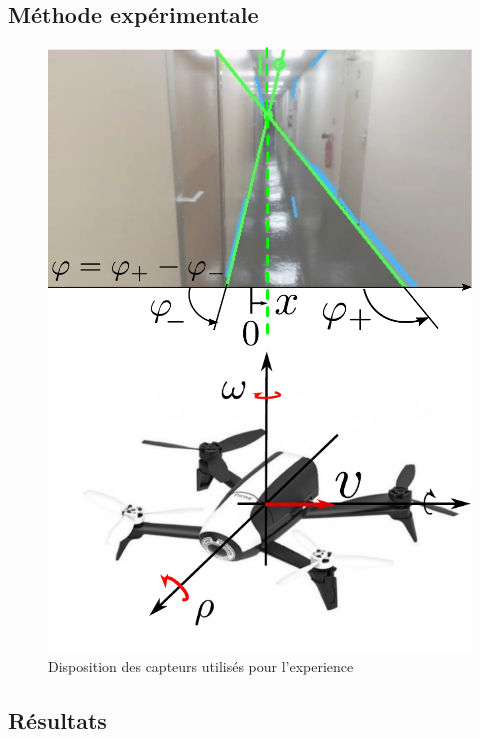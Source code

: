 \subsection{Méthode expérimentale}

\begin{figure}
\begin{minipage}{0.5\textwidth}
\includegraphics[width=\textwidth]{visudrone}
\end{minipage}
\begin{minipage}{0.5\textwidth}
\includegraphics[width=\textwidth]{dronesteup}
\end{minipage}
\caption{Disposition des capteurs utilisés pour l'experience}
\end{figure}


\subsection{Résultats}

